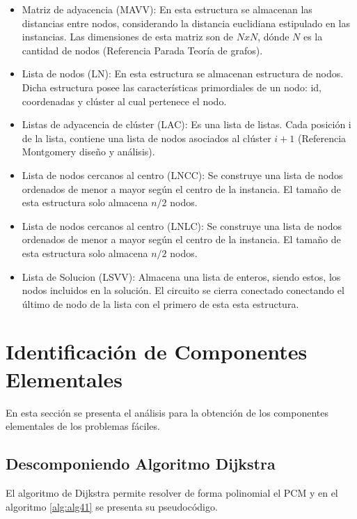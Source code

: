 \begin{itemize}
\item Matriz de adyacencia (MAVV): En esta estructura se almacenan las distancias entre nodos, considerando la distancia euclidiana estipulado en las instancias. Las dimensiones de esta matriz son de $N x N$, dónde $N$ es la cantidad de nodos (Referencia Parada Teoría de grafos).
  
\item Lista de nodos (LN): En esta estructura se almacenan estructura de nodos. Dicha estructura posee las características primordiales de un nodo: id, coordenadas y clúster al cual pertenece el nodo.  

\item Listas de adyacencia de clúster (LAC): Es una lista de listas. Cada posición i de la lista, contiene una lista de nodos asociados al clúster $i+1$ (Referencia Montgomery diseño y análisis).
 
\item Lista de nodos cercanos al centro (LNCC): Se construye una lista de nodos ordenados de menor a mayor según el centro de la instancia. El tamaño de esta estructura solo almacena $n/2$ nodos.
 
\item Lista de nodos cercanos al centro (LNLC):  Se construye una lista de nodos ordenados de menor a mayor según el centro de la instancia. El tamaño de esta estructura solo almacena $n/2$ nodos.

\item Lista de Solucion (LSVV): Almacena una lista de enteros, siendo estos, los nodos incluidos en la solución. El circuito se cierra conectado conectando el último de nodo de la lista con el primero de esta esta estructura. 
 
\end{itemize}	
	
\section{Identificación de Componentes Elementales}\label{cap:identificacion_componentes}

En esta sección se presenta el análisis para la obtención de los componentes elementales de los problemas fáciles.

\subsection{Descomponiendo Algoritmo Dijkstra}
El algoritmo de Dijkstra permite resolver de forma polinomial el PCM y en el algoritmo \ref{alg:alg41} se presenta su pseudocódigo.


